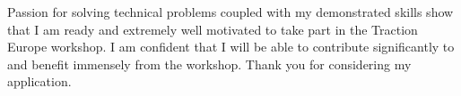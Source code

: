 \documentclass[12pt]{article}
\begin{document}
Passion for solving technical problems coupled with my demonstrated skills show that I am ready and extremely well motivated to take part in the Traction Europe workshop. I am confident that I will be able to contribute significantly to and benefit immensely from the workshop. Thank you for considering my application.
\end{document}
